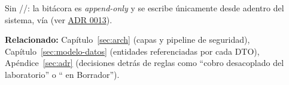 \noindent Sin //: la bitácora es \emph{append-only} y se escribe únicamente desde adentro del sistema, vía \allowbreak {} (ver \hyperref[adr:0013]{ADR 0013}).

\bigskip
\noindent\textbf{Relacionado:} Capítulo~\ref{sec:arch} (capas y pipeline de seguridad), Capítulo~\ref{sec:modelo-datos} (entidades referenciadas por cada DTO), Apéndice~\ref{sec:adr} (decisiones detrás de reglas como ``cobro desacoplado del laboratorio'' o `` en Borrador'').
